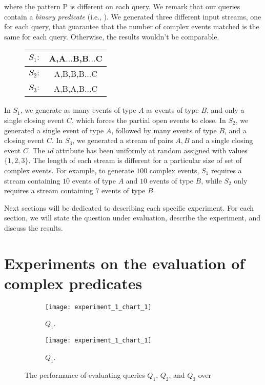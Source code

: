 where the pattern \textrm{P} is different on each query. We remark that our queries contain a \emph{binary predicate} (i.e., ). We generated three different input streams, one for each query, that guarantee that the number of complex events matched is the same for each query. Otherwise, the results wouldn't be comparable.

\begin{figure}[H]
  \centering
  \begin{tabular}{l c}
    \hline
    $S_{1}:$ & A,A$\ldots$B,B$\ldots$C\\
    \hline
    $S_{2}:$ & A,B,B,B$\ldots$C\\
    \hline
    $S_{3}:$ & A,B,A,B$\ldots$C\\
    \hline
  \end{tabular}
\end{figure}

In $S_{1}$, we generate as many events of type $A$ as events of type $B$, and only a single closing event $C$, which forces the partial open events to close. In $S_{2}$, we generated a single event of type $A$, followed by many events of type $B$, and a closing event $C$. In $S_{3}$, we generated a stream of pairs $A, B$ and a single closing event $C$. The $id$ attribute has been uniformly at random assigned with values $\{1, 2, 3\}$. The length of each stream is different for a particular size of set of complex events. For example, to generate $100$ complex events, $S_{1}$ requires a stream containing $10$ events of type $A$ and $10$ events of type $B$, while $S_{2}$ only requires a stream containing $7$ events of type $B$.

Next sections will be dedicated to describing each specific experiment. For each section, we will state the question under evaluation, describe the experiment, and discuss the results.

\section{Experiments on the evaluation of complex predicates}\label{sec:predicates}

\begin{figure}
     \centering
     \begin{subfigure}[b]{0.3\textwidth}
         \centering
         \texttt{[image: experiment\_1\_chart\_1]}
         \caption{$Q_{1}$.}
         \label{fig:experiment:1:subfigure:1}
     \end{subfigure}
     \hfill
     \begin{subfigure}[b]{0.3\textwidth}
         \centering
         \texttt{[image: experiment\_1\_chart\_1]}
         \caption{$Q_{1}$.}
         \label{fig:experiment:1:subfigure:1}
     \end{subfigure}
     \hfill
     \begin{subfigure}[b]{0.3\textwidth}
     \end{subfigure}
     \caption{The performance of evaluating queries $Q_{1}$, $Q_{2}$, and $Q_{3}$ over }
     \label{fig:experiment:1}
\end{figure}

